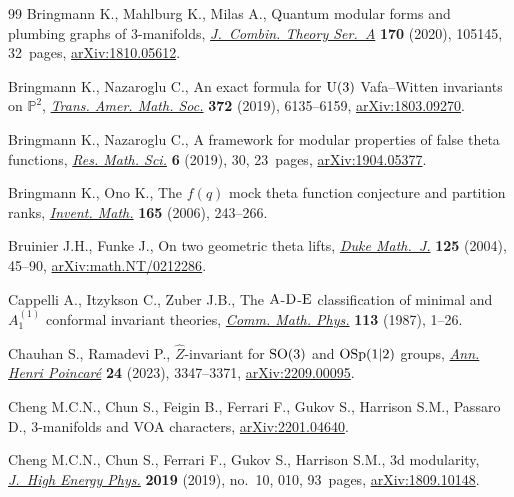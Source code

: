 \documentclass[10pt,a4paper]{amsart}
\theoremstyle{definition}
\numberwithin{equation}{section}
\begin{document}
\begin{thebibliography}{99}
Bringmann K., Mahlburg K., Milas A., Quantum modular forms and plumbing graphs
 of {3}-manifolds, \href{https://doi.org/10.1016/j.jcta.2019.105145}{\textit{J.~Combin. Theory Ser.~A}} \textbf{170} (2020),
 105145, 32~pages, \href{https://arxiv.org/abs/1810.05612}{arXiv:1810.05612}.

Bringmann K., Nazaroglu C., An exact formula for {$\rm U(3)$} {V}afa--{W}itten
 invariants on {$\mathbb P^2$}, \href{https://doi.org/10.1090/tran/7714}{\textit{Trans. Amer. Math. Soc.}} \textbf{372}
 (2019), 6135--6159, \href{https://arxiv.org/abs/1803.09270}{arXiv:1803.09270}.

Bringmann K., Nazaroglu C., A framework for modular properties of false theta
 functions, \href{https://doi.org/10.1007/s40687-019-0192-2}{\textit{Res. Math. Sci.}} \textbf{6} (2019), 30, 23~pages,
 \href{https://arxiv.org/abs/1904.05377}{arXiv:1904.05377}.

Bringmann K., Ono K., The {$f(q)$} mock theta function conjecture and partition
 ranks, \href{https://doi.org/10.1007/s00222-005-0493-5}{\textit{Invent. Math.}} \textbf{165} (2006), 243--266.

Bruinier J.H., Funke J., On two geometric theta lifts, \href{https://doi.org/10.1215/S0012-7094-04-12513-8}{\textit{Duke Math.~J.}}
 \textbf{125} (2004), 45--90, \href{https://arxiv.org/abs/math.NT/0212286}{arXiv:math.NT/0212286}.

Cappelli A., Itzykson C., Zuber J.B., The {${\rm A}$}-{${\rm D}$}-{${\rm E}$}
 classification of minimal and {$A^{(1)}_1$} conformal invariant theories,
 \href{https://doi.org/10.1007/BF01221394}{\textit{Comm. Math. Phys.}} \textbf{113} (1987), 1--26.

Chauhan S., Ramadevi P., {$\hat Z$}-invariant for ${\rm SO}(3)$ and ${\rm
 OSp}(1|2)$ groups, \href{https://doi.org/10.1007/s00023-023-01332-y}{\textit{Ann. Henri Poincar\'e}} \textbf{24} (2023),
 3347--3371, \href{https://arxiv.org/abs/2209.00095}{arXiv:2209.00095}.

Cheng M.C.N., Chun S., Feigin B., Ferrari F., Gukov S., Harrison S.M., Passaro
 D., 3-manifolds and {VOA} characters, \href{https://arxiv.org/abs/2201.04640}{arXiv:2201.04640}.

Cheng M.C.N., Chun S., Ferrari F., Gukov S., Harrison S.M., 3d modularity,
 \href{https://doi.org/10.1007/jhep10(2019)010}{\textit{J.~High Energy Phys.}} \textbf{2019} (2019), no.~10, 010, 93~pages,
 \href{https://arxiv.org/abs/1809.10148}{arXiv:1809.10148}.


\end{thebibliography}
\end{document}
